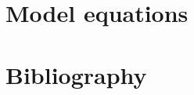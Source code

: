 \documentclass[numbers]{beamer}
\begin{document}
%	

	\section{Model equations}
	

	\section{Bibliography}
	
\end{document}
